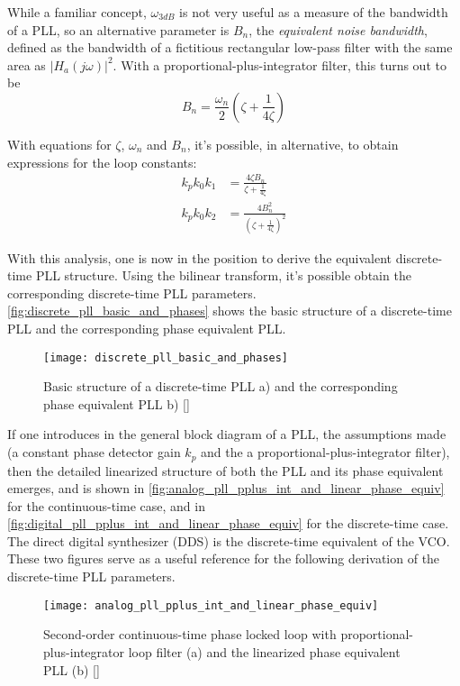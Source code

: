 While a familiar concept, $\omega_{3dB}$ is not very useful as a measure of the bandwidth of a PLL, so an alternative parameter is $B_n$, the \emph{equivalent noise bandwidth}, defined as the bandwidth of a fictitious rectangular low-pass filter with the same area as $|H_a(j\omega)|^2$. With a proportional-plus-integrator filter, this turns out to be
\begin{equation}B_n=\frac{\omega_n}{2}\left(\zeta+\frac{1}{4\zeta}\right)\end{equation}

With equations for $\zeta$, $\omega_n$ and $B_n$, it's possible, in alternative, to obtain expressions for the loop constants:
\begin{align}
k_p k_0 k_1 &= \frac{4\zeta B_n}{\zeta+\frac{1}{4\zeta}}\\
k_p k_0 k_2 &= \frac{4 B_n^2}{\left(\zeta+\frac{1}{4\zeta}\right)^2}
\end{align}

With this analysis, one is now in the position to derive the equivalent discrete-time PLL structure. Using the bilinear transform, it's possible obtain the corresponding discrete-time PLL parameters. \autoref{fig:discrete_pll_basic_and_phases} shows the basic structure of a discrete-time PLL and the corresponding phase equivalent PLL.

\begin{figure}[ht]
  \centering
  \texttt{[image: discrete\_pll\_basic\_and\_phases]}
  \caption{Basic structure of a discrete-time PLL a) and the corresponding phase equivalent PLL b) [\citeauthor{digcomm_discrete_approach}]}
  \label{fig:discrete_pll_basic_and_phases}
\end{figure}

If one introduces in the general block diagram of a PLL, the assumptions made (a constant phase detector gain $k_p$ and the a proportional-plus-integrator filter), then the detailed linearized structure of both the PLL and its phase equivalent emerges, and is shown in \autoref{fig:analog_pll_pplus_int_and_linear_phase_equiv} for the continuous-time case, and in \autoref{fig:digital_pll_pplus_int_and_linear_phase_equiv} for the discrete-time case. The direct digital synthesizer (DDS) is the discrete-time equivalent of the VCO. These two figures serve as a useful reference for the following derivation of the discrete-time PLL parameters.

\begin{figure}[H]
  \centering
  \texttt{[image: analog\_pll\_pplus\_int\_and\_linear\_phase\_equiv]}
  \caption{Second-order continuous-time phase locked loop with proportional-plus-integrator loop filter (a) and the linearized phase equivalent PLL (b) [\citeauthor{digcomm_discrete_approach}]}
  \label{fig:analog_pll_pplus_int_and_linear_phase_equiv}
\end{figure}

